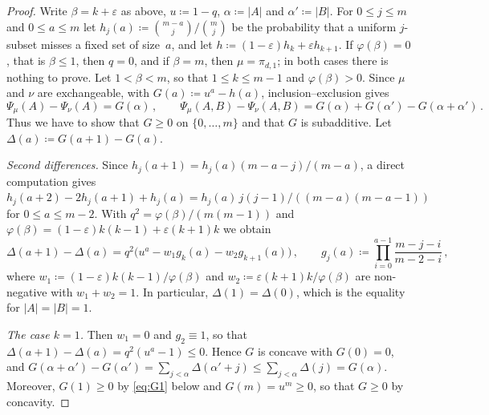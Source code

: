 \documentclass[11pt,letterpaper]{article}
\begin{document}
\begin{proof}
Write $\beta=k+\varepsilon$ as above, $u\coloneqq1-q$, $\alpha\coloneqq|A|$ and $\alpha'\coloneqq|B|$. For $0\le j\le m$ and $0\le a\le m$ let $h_j(a)\coloneqq\binom{m-a}{j}/\binom mj$ be the probability that a uniform $j$-subset misses a fixed set of size~$a$, and let $h\coloneqq(1-\varepsilon)h_k+\varepsilon h_{k+1}$. If $\varphi(\beta)=0$, that is $\beta\le1$, then $q=0$, and if $\beta=m$, then $\mu=\pi_{d,1}$; in both cases there is nothing to prove. Let $1<\beta<m$, so that $1\le k\le m-1$ and $\varphi(\beta)>0$. Since $\mu$ and $\nu$ are exchangeable, with $G(a)\coloneqq u^a-h(a)$, inclusion--exclusion gives
\begin{equation*}
\Psi_\mu(A)-\Psi_\nu(A)=G(\alpha)\,,\qquad\Psi_\mu(A,B)-\Psi_\nu(A,B)=G(\alpha)+G(\alpha')-G(\alpha+\alpha')\,.
\end{equation*}
Thus we have to show that $G\ge0$ on $\{0,\dots,m\}$ and that $G$ is subadditive. Let $\Delta(a)\coloneqq G(a+1)-G(a)$.

\emph{Second differences.} Since $h_j(a+1)=h_j(a)(m-a-j)/(m-a)$, a direct computation gives $h_j(a+2)-2h_j(a+1)+h_j(a)=h_j(a)\,j(j-1)/((m-a)(m-a-1))$ for $0\le a\le m-2$. With $q^2=\varphi(\beta)/(m(m-1))$ and $\varphi(\beta)=(1-\varepsilon)k(k-1)+\varepsilon(k+1)k$ we obtain
\begin{equation}\label{eq:second}
\Delta(a+1)-\Delta(a)=q^2\big(u^a-w_1g_k(a)-w_2g_{k+1}(a)\big)\,,\qquad g_j(a)\coloneqq\prod_{i=0}^{a-1}\frac{m-j-i}{m-2-i}\,,
\end{equation}
where $w_1\coloneqq(1-\varepsilon)k(k-1)/\varphi(\beta)$ and $w_2\coloneqq\varepsilon(k+1)k/\varphi(\beta)$ are non-negative with $w_1+w_2=1$. In particular, $\Delta(1)=\Delta(0)$, which is the equality for $|A|=|B|=1$.

\emph{The case $k=1$.} Then $w_1=0$ and $g_2\equiv1$, so that $\Delta(a+1)-\Delta(a)=q^2(u^a-1)\le0$. Hence $G$ is concave with $G(0)=0$, and $G(\alpha+\alpha')-G(\alpha')=\sum_{j<\alpha}\Delta(\alpha'+j)\le\sum_{j<\alpha}\Delta(j)=G(\alpha)$. Moreover, $G(1)\ge0$ by \eqref{eq:G1} below and $G(m)=u^m\ge0$, so that $G\ge0$ by concavity.


\end{proof}
\end{document}
